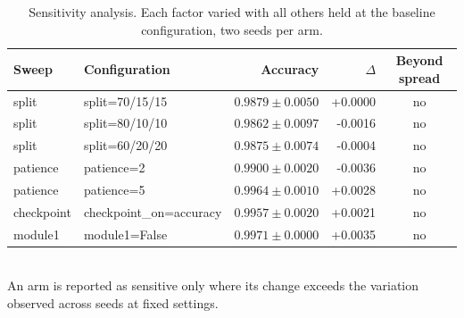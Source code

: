 \begin{table}[htbp]
\centering
\caption{Sensitivity analysis. Each factor varied with all others held at the baseline configuration, two seeds per arm.}
\label{tab:sweeps}
\begin{tabular}{llrrc}
\hline
Sweep & Configuration & Accuracy & $\Delta$ & Beyond spread \\
\hline
split & split=70/15/15 & $0.9879 \pm 0.0050$ & +0.0000 & no \\
split & split=80/10/10 & $0.9862 \pm 0.0097$ & -0.0016 & no \\
split & split=60/20/20 & $0.9875 \pm 0.0074$ & -0.0004 & no \\
patience & patience=2 & $0.9900 \pm 0.0020$ & -0.0036 & no \\
patience & patience=5 & $0.9964 \pm 0.0010$ & +0.0028 & no \\
checkpoint & checkpoint_on=accuracy & $0.9957 \pm 0.0020$ & +0.0021 & no \\
module1 & module1=False & $0.9971 \pm 0.0000$ & +0.0035 & no \\
\hline
\end{tabular}
\\[2pt]\footnotesize{An arm is reported as sensitive only where its change exceeds the variation observed across seeds at fixed settings.}
\end{table}
